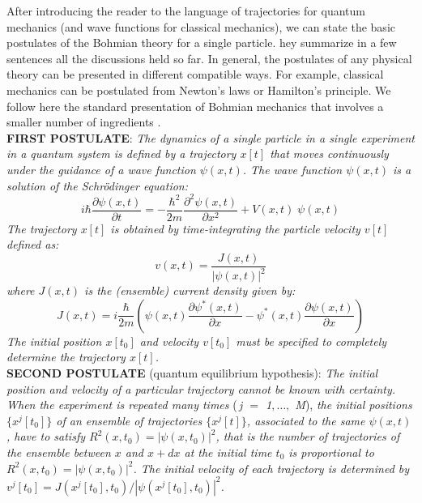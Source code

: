 \documentclass[nofootinbib, secnumarabic, amsmath, nobibnotes,11pt,aps,pra, floatfix]{revtex4-1}
\begin{document}
After introducing the reader to the language of trajectories for
quantum mechanics (and wave functions for classical mechanics), we
can state the basic postulates of the Bohmian theory  for a single particle. hey summarize in a few sentences all the discussions held so far. In general, the
postulates of any physical theory can be presented in different
compatible ways. For example, classical mechanics can be postulated
from Newton's laws or Hamilton's principle. We follow here the
standard presentation of Bohmian mechanics that involves a smaller
number of ingredients
\cite{om.Holand1993,om.Valentini2006,om.Bohmian1996,om.Durrllibre,om.reviewabc,om.llibreph}.\\

\noindent\textbf{FIRST POSTULATE}: \textit{The dynamics of a single particle in a single experiment in a quantum system is defined by a trajectory $x[t]$ that moves continuously under the guidance of a wave function $\psi(x,t)$.
The wave function $\psi(x,t)$ is a solution of the Schr\"odinger equation:}
\begin{equation*}
i \hbar \frac{\partial \psi(x,t)} {\partial t} = -\frac {\hbar^2} {2m} \frac{ {\partial}^2 \psi(x,t)} {\partial x^2} + V(x,t) \;\psi(x,t)
\end{equation*}
\textit{The trajectory $x[t]$ is obtained by time-integrating the particle velocity $v[t]$ defined as:}
\begin{equation*}
v(x,t) = \frac{J(x,t)} {|\psi(x,t)|^2}
\end{equation*}
\textit{where $J(x,t)$ is the (ensemble) current density given by:}
\begin{equation*}
J(x,t) = i \frac {\hbar} {2 m} \left(\psi(x,t) \frac {\partial \psi^{*}(x,t)} {\partial x}- \psi^{*}(x,t) \frac {\partial \psi(x,t)} {\partial x} \right)
\end{equation*}
\textit{The initial position $x[t_0]$ and velocity $v[t_0]$ must be specified to completely determine the trajectory $x[t]$.} \\

\noindent\textbf{SECOND POSTULATE} (quantum equilibrium hypothesis): \textit{The initial position and velocity of a particular trajectory cannot be known with certainty. When the experiment is repeated many times}  (\textit{\,j $=$ 1$,\ldots,$ M}), \textit{the initial positions $\{ x^j[t_0] \}$ of an ensemble of trajectories $\{x^j[t] \}$, associated to the same $\psi(x,t)$, have to satisfy $R^2(x,t_0) = |\psi(x,t_0)|^2$, that is the number of trajectories of the ensemble between $x$ and $x + dx$ at the initial time $t_0$ is proportional to $R^2(x,t_0) = |\psi(x,t_0)|^2$. The initial velocity of each trajectory is determined by $v^j[t_0] = J(x^j[t_0],t_0)/|\psi(x^j[t_0],t_0)|^2$.}\\
\end{document}
